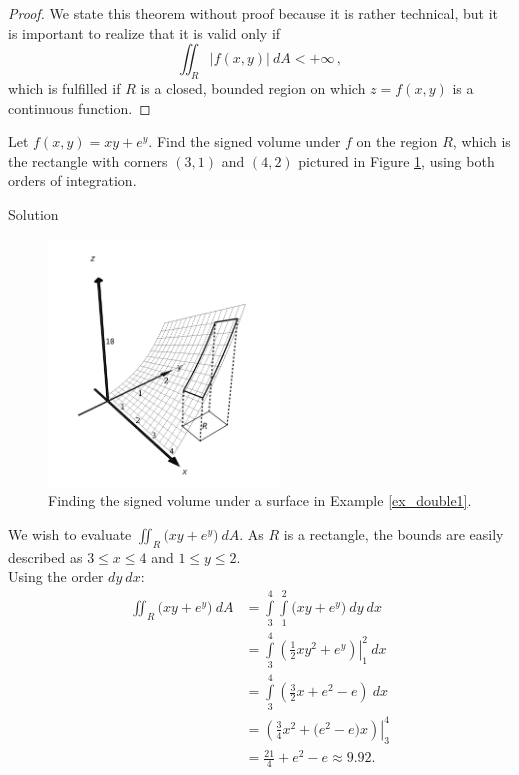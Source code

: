 \ifanalysis
\begin{proof}
We state this theorem without proof because it is rather technical, but it is important to realize that it is valid only if 
$$\iint_R \left|f(x,y)\right|\ dA<+\infty\,,$$
which is fulfilled if $R$ is a closed, bounded region on which $z=f(x,y)$ is a continuous function. 
\end{proof}
\fi

\begin{example}\label{ex_double1}
Let $f(x,y) = xy+e^y$. Find the signed volume under $f$ on the region $R$, which is the rectangle with corners $(3,1)$ and $(4,2)$ pictured in Figure \ref{fig_multiple_7}, using both orders of integration.

\pagebreak
{}Solution 


\begin{figure}[H]
	\begin{center}
			\includegraphics[width=0.55\textwidth]{fig_multiple_7}
	\caption{Finding the signed volume under a surface in Example \ref{ex_double1}.}
	\label{fig_multiple_7}
	\end{center}
\end{figure}


We wish to evaluate $\iint_R \big(xy+e^y\big)\ dA$. As $R$ is a rectangle, the bounds are easily described as $3\leq x\leq 4$ and $1\leq y\leq 2$.\\

Using the order $dy\ dx$:
\begin{align*}
\iint_R\big(xy+e^y\big) \ dA &= \int\limits_3^4\int\limits_1^2\big(xy+e^y\big)\ dy \ dx \\
			&= \int\limits_3^4 \left.\left(\frac12xy^2+e^y\right)\right|_1^2\  dx \\
			&= \int\limits_3^4\left(\frac 32x + e^2-e\right)\ dx \\
			&= \left.\left(\frac 34x^2 + \big(e^2-e\big)x\right)\right|_3^4 \\
			&= \frac {21}4+ e^2-e\approx 9.92.
\end{align*}



\end{example}
